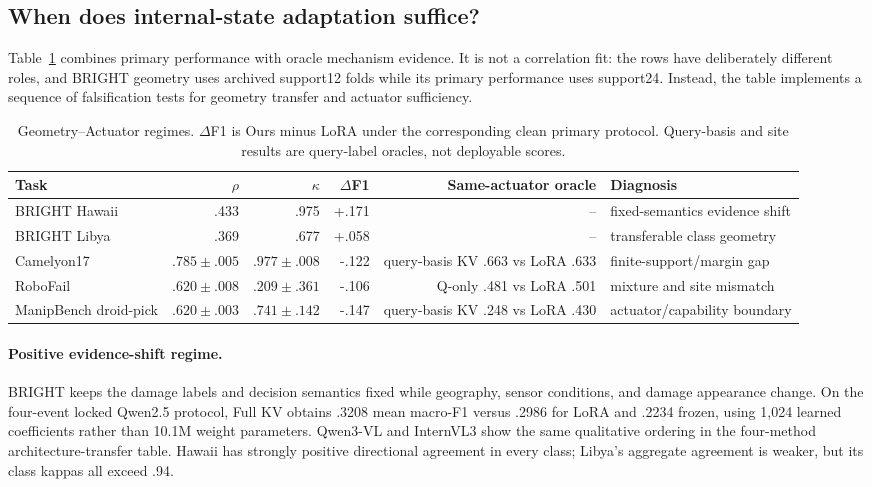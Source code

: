 \documentclass[conference]{IEEEtran}
\begin{document}
\subsection{When does internal-state adaptation suffice?}
Table~\ref{tab:regimes} combines primary performance with oracle mechanism
evidence.  It is not a correlation fit: the rows have deliberately different
roles, and BRIGHT geometry uses archived support12 folds while its primary
performance uses support24.  Instead, the table implements a sequence of
falsification tests for geometry transfer and actuator sufficiency.

\begin{table}[t]
\centering\small
\caption{Geometry--Actuator regimes.  $\Delta$F1 is Ours minus LoRA under the
corresponding clean primary protocol.  Query-basis and site results are
query-label oracles, not deployable scores.}
\label{tab:regimes}
\begin{tabular}{lrrrrl}
\toprule
Task & $\rho$ & $\kappa$ & $\Delta$F1 & Same-actuator oracle & Diagnosis\\
\midrule
BRIGHT Hawaii & .433 & .975 & +.171 & -- & fixed-semantics evidence shift\\
BRIGHT Libya & .369 & .677 & +.058 & -- & transferable class geometry\\
Camelyon17 & $.785\pm.005$ & $.977\pm.008$ & -.122 & query-basis KV .663 vs LoRA .633 & finite-support/margin gap\\
RoboFail & $.620\pm.008$ & $.209\pm.361$ & -.106 & Q-only .481 vs LoRA .501 & mixture and site mismatch\\
ManipBench droid-pick & $.620\pm.003$ & $.741\pm.142$ & -.147 & query-basis KV .248 vs LoRA .430 & actuator/capability boundary\\
\bottomrule
\end{tabular}
\end{table}

\paragraph{Positive evidence-shift regime.}
BRIGHT keeps the damage labels and decision semantics fixed while geography,
sensor conditions, and damage appearance change.  On the four-event locked
Qwen2.5 protocol, Full KV obtains .3208 mean macro-F1 versus .2986 for LoRA and
.2234 frozen, using 1,024 learned coefficients rather than 10.1M weight
parameters.  Qwen3-VL and InternVL3 show the same qualitative ordering in the
four-method architecture-transfer table.  Hawaii has strongly positive
directional agreement in every class; Libya's aggregate agreement is weaker,
but its class kappas all exceed .94.
\end{document}
